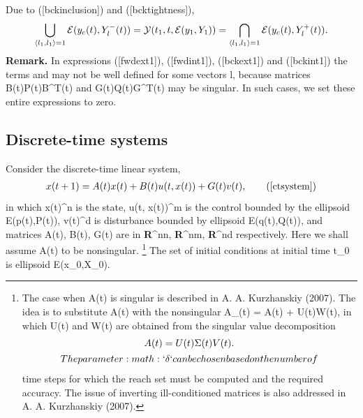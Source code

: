 \documentclass[letterpaper,10pt,english]{sphinxmanual}
\begin{document}
Due to ({[}bckinclusion{]}) and ({[}bcktightness{]}),
\begin{gather}
\begin{split}\bigcup_{\langle l_1,l_1\rangle=1}{\mathcal E}(y_c(t),Y^-_l(t)) =
{\mathcal Y}(t_1,t,{\mathcal E}(y_1,Y_1)) =
\bigcap_{\langle l_1,l_1\rangle=1}{\mathcal E}(y_c(t),Y^+_l(t)).\end{split}\notag
\end{gather}
\textbf{Remark.} In expressions ({[}fwdext1{]}), ({[}fwdint1{]}), ({[}bckext1{]}) and
({[}bckint1{]}) the terms  and
 may not be well defined for some vectors
l, because matrices B(t)P(t)B^T(t) and
G(t)Q(t)G^T(t) may be singular. In such cases, we set these
entire expressions to zero.


\subsection{Discrete-time systems}
\label{chap_reach:discrete-time-systems}
Consider the discrete-time linear system,
\begin{gather}
\begin{split}x(t+1) = A(t)x(t) + B(t)u(t,x(t)) + G(t)v(t),
\tag*{(\ref{ctsystem})}
\label{dtsystem}\end{split}\notag
\end{gather}
in which x(t)^n is the state,
u(t, x(t))^m is the control bounded by the ellipsoid
{\mathcal E}(p(t),P(t)), v(t)^d is disturbance
bounded by ellipsoid {\mathcal E}(q(t),Q(t)), and matrices
A(t), B(t), G(t) are in
{\bf R}^{n\times n}, {\bf R}^{n\times m},
{\bf R}^{n\times d} respectively. Here we shall assume
A(t) to be nonsingular. \footnote{
The case when A(t) is singular is described in A. A.
Kurzhanskiy (2007). The idea is to substitute A(t) with the
nonsingular A_\delta(t) = A(t) + \delta U(t)W(t), in which
U(t) and W(t) are obtained from the singular value
decomposition
\begin{gather}
\begin{split}A(t) = U(t)\Sigma(t)V(t) .\end{split}\notag\\\begin{split}The parameter :math:`\delta` can be chosen based on the number of\end{split}\notag
\end{gather}
time steps for which the reach set must be computed and the required
accuracy. The issue of inverting ill-conditioned matrices is also
addressed in A. A. Kurzhanskiy (2007).
} The set of initial conditions at
initial time t_0 is ellipsoid {\mathcal E}(x_0,X_0).
\end{document}
